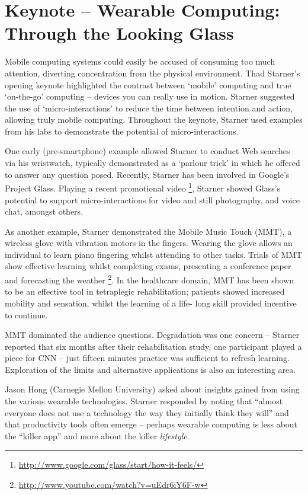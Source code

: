 \section{Keynote -- Wearable Computing: Through the Looking Glass}
\label{sec:keynote}
Mobile computing systems could easily be accused of consuming too much
attention, diverting concentration from the physical environment. Thad
Starner's opening keynote highlighted the contrast between `mobile'
computing and true `on-the-go' computing -- devices you can really use in
motion. Starner suggested the use of `micro-interactions' to reduce the time 
between intention and action, allowing truly mobile computing. Throughout the 
keynote, Starner used examples from his labs to demonstrate the potential of 
micro-interactions.


One early (pre-smartphone) example allowed Starner to conduct Web searches 
via his wristwatch, typically demonstrated as a `parlour trick' in which 
he offered to answer any question posed. Recently, Starner has been involved in 
Google's Project Glass. Playing a recent promotional video 
\footnote{\url{http://www.google.com/glass/start/how-it-feels/}}, Starner showed 
Glass's potential to support micro-interactions for video and still 
photography, and voice chat, amongst others.

As another example, Starner demonstrated the Mobile Music Touch (MMT), a wireless glove
with vibration motors in the fingers. Wearing the glove allows an individual to
learn piano fingering whilst attending to other tasks.
Trials of MMT show effective learning whilst completing exams, presenting a
conference paper and forecasting the weather
\footnote{\url{http://www.youtube.com/watch?v=uEdr6iY6F-w}}.
In the healthcare domain,
MMT has been shown to be an effective tool in tetraplegic rehabilitation; 
patients showed increased mobility and sensation, whilst the learning of a life-
long skill provided incentive to continue.

MMT dominated the audience questions. Degradation was one concern -- Starner 
reported that six months after their rehabilitation study, one participant played 
a piece for CNN -- just fifteen minutes practice was sufficient to refresh 
learning. Exploration of the limits and alternative applications is also an 
interesting area.

Jason Hong (Carnegie Mellon University) asked about insights gained from using
the various wearable technologies. Starner responded by noting that 
``almost everyone does not use a technology the way they initially 
think they will'' and that productivity tools often emerge -- perhaps wearable 
computing is less about the ``killer app'' and more about the killer 
\emph{lifestyle}.
